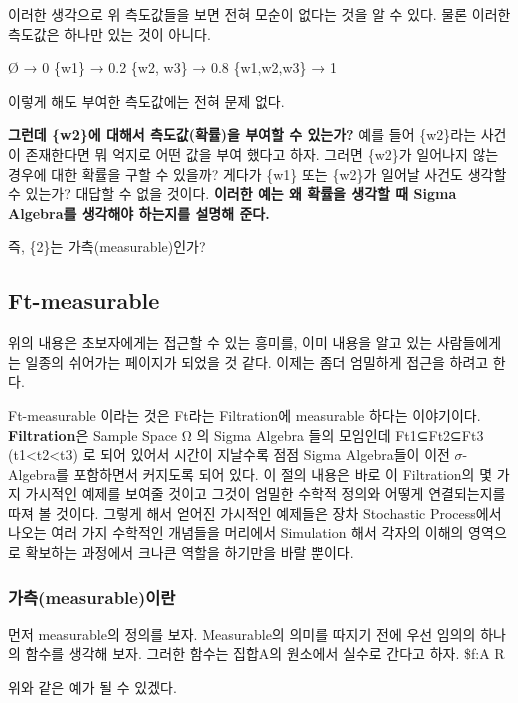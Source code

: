 \documentclass[
]{book}
\begin{document}
{{{이러한 생각으로 위 측도값들을 보면 전혀 모순이 없다는 것을 알 수 있다. 물론 이러한 측도값은 하나만 있는 것이 아니다.

Ø → 0
\{w1\} → 0.2
\{w2, w3\} → 0.8
\{w1,w2,w3\} → 1

이렇게 해도 부여한 측도값에는 전혀 문제 없다.

\textbf{그런데 \{w2\}에 대해서 측도값(확률)을 부여할 수 있는가?} 예를 들어 \{w2\}라는 사건이 존재한다면 뭐 억지로 어떤 값을 부여 했다고 하자. 그러면 \{w2\}가 일어나지 않는 경우에 대한 확률을 구할 수 있을까? 게다가 \{w1\} 또는 \{w2\}가 일어날 사건도 생각할 수 있는가? 대답할 수 없을 것이다. \textbf{이러한 예는 왜 확률을 생각할 때 Sigma Algebra를 생각해야 하는지를 설명해 준다.}

즉, \{2\}는 가측(measurable)인가?

\hypertarget{ft-measurable}{%
\subsection{Ft-measurable}\label{ft-measurable}}

위의 내용은 초보자에게는 접근할 수 있는 흥미를, 이미 내용을 알고 있는 사람들에게는 일종의 쉬어가는 페이지가 되었을 것 같다. 이제는 좀더 엄밀하게 접근을 하려고 한다.

Ft-measurable 이라는 것은 Ft라는 Filtration에 measurable 하다는 이야기이다. \textbf{Filtration}은 Sample Space Ω 의 Sigma Algebra 들의 모임인데 Ft1⊆Ft2⊆Ft3 (t1\textless t2\textless t3) 로 되어 있어서 시간이 지날수록 점점 Sigma Algebra들이 이전 \(\sigma\)-Algebra를 포함하면서 커지도록 되어 있다. 이 절의 내용은 바로 이 Filtration의 몇 가지 가시적인 예제를 보여줄 것이고 그것이 엄밀한 수학적 정의와 어떻게 연결되는지를 따져 볼 것이다. 그렇게 해서 얻어진 가시적인 예제들은 장차 Stochastic Process에서 나오는 여러 가지 수학적인 개념들을 머리에서 Simulation 해서 각자의 이해의 영역으로 확보하는 과정에서 크나큰 역할을 하기만을 바랄 뿐이다.

\hypertarget{uxac00uxce21measurableuxc774uxb780}{%
\subsubsection{가측(measurable)이란}\label{uxac00uxce21measurableuxc774uxb780}}

먼저 measurable의 정의를 보자. Measurable의 의미를 따지기 전에 우선 임의의 하나의 함수를 생각해 보자. 그러한 함수는 집합A의 원소에서 실수로 간다고 하자. \$f:A \Longrightarrow R

위와 같은 예가 될 수 있겠다.

}}}
\end{document}
